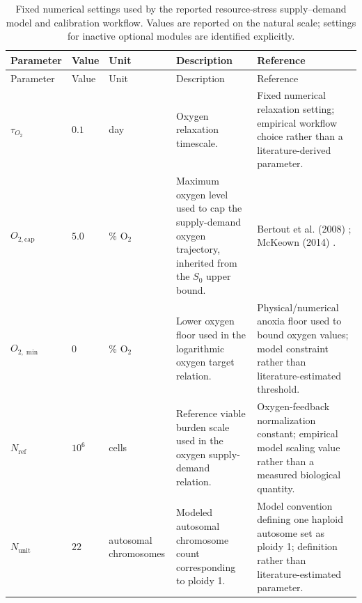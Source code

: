 \begingroup
\scriptsize
\setlength{\tabcolsep}{3pt}
\setlength\LTleft{0pt}
\setlength\LTright{0pt}
\newlength{\FixedParamTableWidth}
\setlength{\FixedParamTableWidth}{\dimexpr\textwidth-8\tabcolsep\relax}
\begin{longtable}{@{}>{\raggedright\arraybackslash}p{0.11\FixedParamTableWidth}>{\raggedright\arraybackslash}p{0.06\FixedParamTableWidth}>{\raggedright\arraybackslash}p{0.10\FixedParamTableWidth}>{\raggedright\arraybackslash}p{0.48\FixedParamTableWidth}>{\raggedright\arraybackslash}p{0.25\FixedParamTableWidth}@{}}
\caption{Fixed numerical settings used by the reported resource-stress supply--demand model and calibration workflow. Values are reported on the natural scale; settings for inactive optional modules are identified explicitly.}
\label{tab:model_fixed_parameters}\\

\toprule
Parameter & Value & Unit & Description & Reference \\
\midrule
\endfirsthead

\toprule
Parameter & Value & Unit & Description & Reference \\
\midrule
\endhead

$\tau_{O_2}$ & $0.1$ & day & Oxygen relaxation timescale. & Fixed numerical relaxation setting; empirical workflow choice rather than a literature-derived parameter. \\

$O_{2,\mathrm{cap}}$ & $5.0$ & \% O$_2$ & Maximum oxygen level used to cap the supply-demand oxygen trajectory, inherited from the $S_0$ upper bound. & Bertout et al. (2008) \cite{bertout_impact_2008}; McKeown (2014) \cite{mckeown_defining_2014}. \\

$O_{2,\min}$ & $0$ & \% O$_2$ & Lower oxygen floor used in the logarithmic oxygen target relation. & Physical/numerical anoxia floor used to bound oxygen values; model constraint rather than literature-estimated threshold. \\

$N_{\mathrm{ref}}$ & $10^{6}$ & cells & Reference viable burden scale used in the oxygen supply-demand relation. & Oxygen-feedback normalization constant; empirical model scaling value rather than a measured biological quantity. \\

$N_{\mathrm{unit}}$ & $22$ & autosomal chromosomes & Modeled autosomal chromosome count corresponding to ploidy 1. & Model convention defining one haploid autosome set as ploidy 1; definition rather than literature-estimated parameter. \\


\end{longtable}
